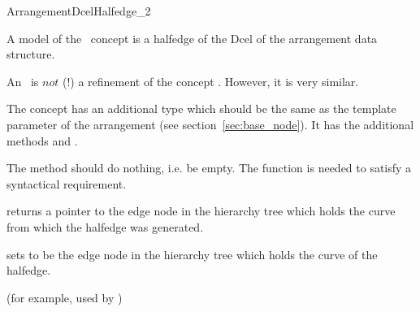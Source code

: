 
\ccRefPageBegin


\begin{ccRefConcept}{ArrangementDcelHalfedge_2}

\ccDefinition

    A model of the \ccRefName\ concept is a halfedge of the Dcel of
    the arrangement data structure. 

    An \ccRefName\ is $not$ (!) a refinement of the
     concept . However, it is very
    similar.

    The concept has an additional type  which should be
    the same as the template parameter  of the
    arrangement (see section~\ref{sec:base_node}).  It has the
    additional methods  and
    .

    The method  should do nothing, i.e. be empty.
    The function is needed to satisfy a syntactical requirement.

\ccDefinition


\ccOperations
    {returns a pointer to the edge node in the hierarchy tree which
       holds the curve from 
       which the halfedge was generated.}

    {sets  to be the edge node in the hierarchy tree which
       holds the curve of the halfedge.}


\ccHasModels
   (for example, used by
   )

\end{ccRefConcept}

\ccRefPageEnd

